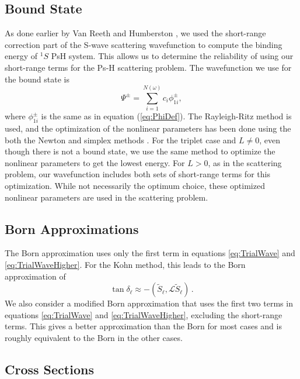 \documentclass[preprint,showpacs,preprintnumbers,amsmath,amssymb]{revtex4}
\begin{document}


\subsection{Bound State}
As done earlier by Van Reeth and Humberston \cite{VanReeth2003,VanReeth2004}, we used the short-range correction part of the S-wave scattering wavefunction to compute the binding energy of $^1S$ PsH system. This allows us to determine the reliability of using our short-range terms for the Ps-H scattering problem. The wavefunction we use for the bound state is
\begin{equation}
\label{eq:BoundWavefn}
\Psi^\pm = \sum_{i=1}^{N(\omega)} c_i \phi_{1i}^\pm,
\end{equation}
where $\phi_{1i}^\pm$ is the same as in equation (\ref{eq:PhiDef}). The Rayleigh-Ritz method is used, and the optimization of the nonlinear parameters has been done using the both the Newton and simplex methods \cite{Yan1999,GSL}. For the triplet case and $L \neq 0$, even though there is not a bound state, we use the same method to optimize the nonlinear parameters to get the lowest energy. For $L > 0$, as in the scattering problem, our wavefunction includes both sets of short-range terms for this optimization. While not necessarily the optimum choice, these optimized nonlinear parameters are used in the scattering problem.


\subsection{Born Approximations}
The Born approximation \cite{?} uses only the first term in equations \ref{eq:TrialWave} and \ref{eq:TrialWaveHigher}. For the Kohn method, this leads to the Born approximation of
\begin{equation}
\label{eq:Born}
\tan\delta_\ell \approx -(\widetilde{S}_\ell,\mathcal{L}\widetilde{S}_\ell )\, .
\end{equation}
We also consider a modified Born approximation that uses the first two terms in equations \ref{eq:TrialWave} and \ref{eq:TrialWaveHigher}, excluding the short-range terms. This gives a better approximation than the Born for most cases and is roughly equivalent to the Born in the other cases.

\subsection{Cross Sections}
\end{document}
